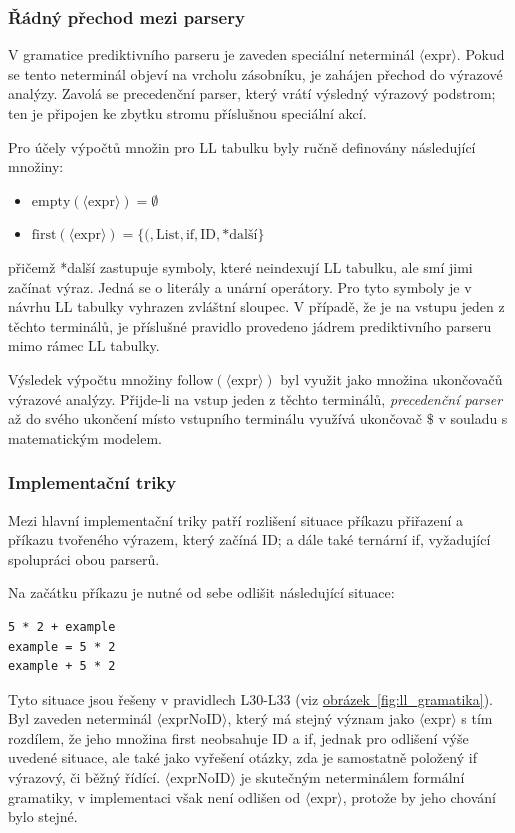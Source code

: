 \documentclass[11pt, a4paper]{article}
\begin{document}
\subsubsection{Řádný přechod mezi parsery}

V gramatice prediktivního parseru je zaveden speciální neterminál $\langle\text{expr}\rangle$. Pokud se tento neterminál objeví na vrcholu zásobníku, je zahájen přechod do výrazové analýzy. Zavolá se precedenční parser, který vrátí výsledný výrazový podstrom; ten je připojen ke zbytku stromu příslušnou speciální akcí.

Pro účely výpočtů množin pro LL tabulku byly ručně definovány následující množiny:
\begin{itemize}
    \item $\text{empty}(\langle\text{expr}\rangle) = \emptyset$
    \item $\text{first}(\langle\text{expr}\rangle) = \{ (, \text{List}, \text{if}, \text{ID}, \text{*další} \}$
\end{itemize}
přičemž *další zastupuje symboly, které neindexují LL tabulku, ale smí jimi začínat výraz. Jedná se o literály a unární operátory. Pro tyto symboly je v návrhu LL tabulky vyhrazen zvláštní sloupec. V případě, že je na vstupu jeden z těchto terminálů, je příslušné pravidlo provedeno jádrem prediktivního parseru mimo rámec LL tabulky.

Výsledek výpočtu množiny $\text{follow}(\langle\text{expr}\rangle)$ byl využit jako množina ukončovačů výrazové analýzy. Přijde-li na vstup jeden z těchto terminálů, \emph{precedenční parser} až do svého ukončení místo vstupního terminálu využívá ukončovač $\$$ v souladu s matematickým modelem.

\subsubsection{Implementační triky}

Mezi hlavní implementační triky patří rozlišení situace příkazu přiřazení a příkazu tvořeného výrazem, který začíná ID; a dále také ternární if, vyžadující spolupráci obou parserů.

Na začátku příkazu je nutné od sebe odlišit následující situace:
\begin{lstlisting}
5 * 2 + example
example = 5 * 2
example + 5 * 2
\end{lstlisting}

Tyto situace jsou řešeny v pravidlech L30-L33 (viz \hyperref[fig:ll_gramatika]{obrázek~\ref*{fig:ll_gramatika}}). Byl zaveden neterminál $\langle\text{exprNoID}\rangle$, který má stejný význam jako $\langle\text{expr}\rangle$ s tím rozdílem, že jeho množina first neobsahuje ID a if, jednak pro odlišení výše uvedené situace, ale také jako vyřešení otázky, zda je samostatně položený if výrazový, či běžný řídící. $\langle\text{exprNoID}\rangle$ je skutečným neterminálem formální gramatiky, v implementaci však není odlišen od $\langle\text{expr}\rangle$, protože by jeho chování bylo stejné.
\end{document}
